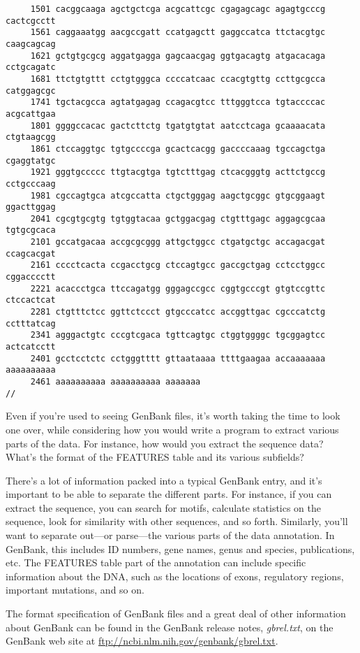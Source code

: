 \begin{lstlisting}
     1501 cacggcaaga agctgctcga acgcattcgc cgagagcagc agagtgcccg cactcgcctt
     1561 caggaaatgg aacgccgatt ccatgagctt gaggccatca ttctacgtgc caagcagcag
     1621 gctgtgcgcg aggatgagga gagcaacgag ggtgacagtg atgacacaga cctgcagatc
     1681 ttctgtgttt cctgtgggca ccccatcaac ccacgtgttg ccttgcgcca catggagcgc
     1741 tgctacgcca agtatgagag ccagacgtcc tttgggtcca tgtaccccac acgcattgaa
     1801 ggggccacac gactcttctg tgatgtgtat aatcctcaga gcaaaacata ctgtaagcgg
     1861 ctccaggtgc tgtgccccga gcactcacgg gaccccaaag tgccagctga cgaggtatgc
     1921 gggtgccccc ttgtacgtga tgtctttgag ctcacgggtg acttctgccg cctgcccaag
     1981 cgccagtgca atcgccatta ctgctgggag aagctgcggc gtgcggaagt ggacttggag
     2041 cgcgtgcgtg tgtggtacaa gctggacgag ctgtttgagc aggagcgcaa tgtgcgcaca
     2101 gccatgacaa accgcgcggg attgctggcc ctgatgctgc accagacgat ccagcacgat
     2161 cccctcacta ccgacctgcg ctccagtgcc gaccgctgag cctcctggcc cggacccctt
     2221 acaccctgca ttccagatgg gggagccgcc cggtgcccgt gtgtccgttc ctccactcat
     2281 ctgtttctcc ggttctccct gtgcccatcc accggttgac cgcccatctg cctttatcag
     2341 agggactgtc cccgtcgaca tgttcagtgc ctggtggggc tgcggagtcc actcatcctt
     2401 gcctcctctc cctgggtttt gttaataaaa ttttgaagaa accaaaaaaa aaaaaaaaaa
     2461 aaaaaaaaaa aaaaaaaaaa aaaaaaa
//
\end{lstlisting}

Even if you're used to seeing GenBank files, it's worth taking the time to look one over, while considering how you would write a program to extract various parts of the data. For instance, how would you extract the sequence data? What's the format of the FEATURES table and its various subfields?

There's a lot of information packed into a typical GenBank entry, and it's important to be able to separate the different parts. For instance, if you can extract the sequence, you can search for motifs, calculate statistics on the sequence, look for similarity with other sequences, and so forth. Similarly, you'll want to separate out—or parse—the various parts of the data annotation. In GenBank, this includes ID numbers, gene names, genus and species, publications, etc. The FEATURES table part of the annotation can include specific information about the DNA, such as the locations of exons, regulatory regions, important mutations, and so on.

The format specification of GenBank files and a great deal of other information about GenBank can be found in the GenBank release notes, \textit{gbrel.txt}, on the GenBank web site at \href{ftp://ncbi.nlm.nih.gov/genbank/gbrel.txt}{ftp://ncbi.nlm.nih.gov/genbank/gbrel.txt}.

